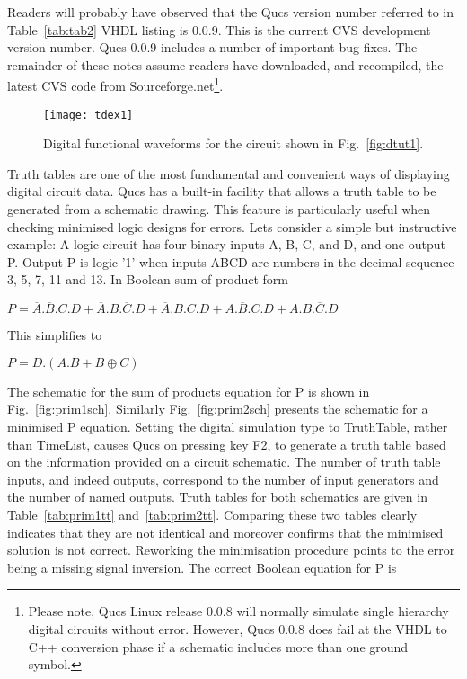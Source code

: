 Readers will probably have observed that the Qucs version number
referred to in Table~\ref{tab:tab2} VHDL listing is 0.0.9.  This is
the current CVS development version number.  Qucs 0.0.9 includes a
number of important bug fixes.  The remainder of these notes assume
readers have downloaded, and recompiled, the latest CVS code from
Sourceforge.net\footnote{Please note, Qucs Linux release 0.0.8 will
normally simulate single hierarchy digital circuits without error.
However, Qucs 0.0.8 does fail at the VHDL to C++ conversion phase if a
schematic includes more than one ground symbol.}.

\begin{figure}[ht]
  \centering
  \texttt{[image: tdex1]}
  \caption{Digital functional waveforms for the circuit shown in Fig.~\ref{fig:dtut1}.}
  \label{fig:tdex1}
\end{figure}
\FloatBarrier


Truth tables are one of the most fundamental and convenient ways of
displaying digital circuit data.  Qucs has a built-in facility that
allows a truth table to be generated from a schematic drawing.  This
feature is particularly useful when checking minimised logic designs
for errors.  Lets consider a simple but instructive example: A logic
circuit has four binary inputs A, B, C, and D, and one output P.
Output P is logic '1' when inputs ABCD are numbers in the decimal 
sequence 3, 5, 7, 11 and 13. In Boolean sum of product form

\begin{center}
\begin{large}$P=\overline{A}.\overline{B}.C.D+
\overline{A}.B.\overline{C}.D+\overline{A}.B.C.D+A.\overline{B}.C.D+
A.B.\overline{C}.D$
\end{large}\end{center}

This simplifies to
\begin{center}
\begin{large}$P=D.(A.B+B \oplus C )$\end{large}
\end{center}
The schematic for the sum of products equation for P is shown in
Fig.~\ref{fig:prim1sch}.  Similarly Fig.~\ref{fig:prim2sch} presents
the schematic for a minimised P equation.  Setting the digital
simulation type to TruthTable, rather than TimeList, causes Qucs on
pressing key F2, to generate a truth table based on the information
provided on a circuit schematic. The number of truth table inputs, and
indeed outputs, correspond to the number of input generators and the
number of named outputs. Truth tables for both schematics are given in
Table~\ref{tab:prim1tt} and~\ref{tab:prim2tt}. Comparing these two
tables clearly indicates that they are not identical and moreover
confirms that the minimised solution is not correct.  Reworking the
minimisation procedure points to the error being a missing signal
inversion.  The correct Boolean equation for P is

